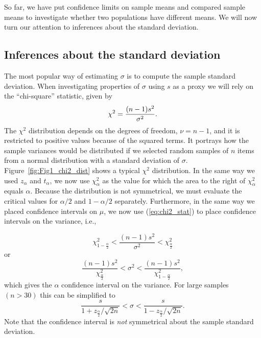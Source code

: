 So far, we have put confidence limits on sample means and compared sample means 
to investigate whether two populations have different means.  We will now turn our attention to 
inferences about the standard deviation.

\subsection{Inferences about the standard deviation}


The most popular way of estimating $\sigma$ is to compute the sample standard deviation.  When 
investigating properties of $\sigma$ using $s$ as a proxy we will rely on the ``chi-square'' statistic, given by
\begin{equation}
	\index{$\chi^2$ statistic (``chi-squared'')}
	\index{Chi-squared statistic ($\chi^2$)}
	\index{Probability distribution!Chi-squared}
	\index{Probability distribution!$\chi^2$}
\chi^2=\frac{(n-1)s^2}{\sigma^2}.
\label{eq:chi2_stat}	 	
\end{equation}
The $\chi^2$ distribution depends on the degrees of freedom, $\nu = n - 1$, and it is restricted to positive 
values because of the squared terms.  It portrays how the sample variances would be 
distributed if we selected random samples of $n$ items from a normal distribution with a standard deviation of $\sigma$.
Figure~\ref{fig:Fig1_chi2_dist} shows a typical $\chi^2$ distribution.
In the same way we used $z_\alpha$ and $t_\alpha$, we now use $\chi^2_\alpha$ as the value for which the area to the right 
of $\chi^2_\alpha$ equals $\alpha$.  Because the distribution is not symmetrical, we must evaluate the
critical values for $\alpha/2$ and $1 - \alpha/2$ separately.
Furthermore, in the same way we placed confidence intervals on $\mu$, we now 
use (\ref{eq:chi2_stat}) to place confidence intervals on the variance, i.e.,

\begin{equation}
\chi^2_{1-\frac{\alpha}{2}}<\frac{(n-1)s^2}{\sigma^2}<\chi^2_\frac{\alpha}{2}
\end{equation}	 
or
\begin{equation}	 
\frac{(n-1)s^2}{\chi^2_\frac{\alpha}{2}}<\sigma^2<\frac{(n-1)s^2}{\chi^2_{1-\frac{\alpha}{2}}},
\end{equation}
which gives the $\alpha$ confidence interval on the variance.  For large samples $(n > 30)$ this can be 
simplified to 
\begin{equation}
\frac{s}{1+{z_\frac{\alpha}{2}/\sqrt{2n}}}<\sigma<\frac{s}{1-{z_\frac{\alpha}{2}/\sqrt{2n}}}.
\end{equation}
Note that the confidence interval is \emph{not} symmetrical about the sample standard deviation.

